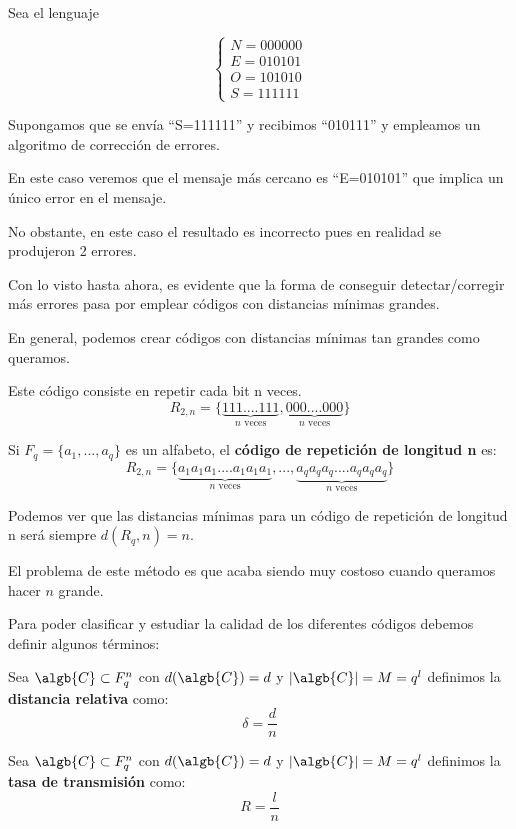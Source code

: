 \begin{example}
Sea el lenguaje

\[\left\{ \begin{array}{l}
N = 000000 \\ E = 010101 \\ O = 101010 \\ S = 111111
\end{array}\right.\]

Supongamos que se envía ``S=111111'' y recibimos ``010111'' y empleamos un algoritmo de corrección de errores.

En este caso veremos que el mensaje más cercano es ``E=010101'' que implica un único error en el mensaje.

No obstante, en este caso el resultado es incorrecto pues en realidad se produjeron 2 errores.
\end{example}

Con lo visto hasta ahora, es evidente que la forma de conseguir detectar/corregir más errores pasa por emplear códigos con distancias mínimas grandes.

En general, podemos crear códigos con distancias mínimas tan grandes como queramos.

\begin{defn}
Este código consiste en repetir cada bit n veces.
\[R_{2,n}=\{\underbrace{111....111}_{n\text{ veces}}, \underbrace{000....000}_{n\text{ veces}}\}\]

Si $F_q=\{a_1,...,a_q\}$ es un alfabeto, el \textbf{código de repetición de longitud n} es:
\[R_{2,n}=\{\underbrace{a_1a_1a_1....a_1a_1a_1}_{n\text{ veces}}, ... , \underbrace{a_qa_qa_q....a_qa_qa_q}_{n\text{ veces}}\}\]
\end{defn}

Podemos ver que las distancias mínimas para un código de repetición de longitud n será siempre $d(R_q,n)=n$.

El problema de este método es que acaba siendo muy costoso cuando queramos hacer $n$ grande.

Para poder clasificar y estudiar la calidad de los diferentes códigos debemos definir algunos términos:

\begin{defn}
Sea $\algb{C} \subset F_q^n$ con $d(\algb{C})=d$ y $|\algb{C}|=M=q^l$ definimos la \textbf{distancia relativa} como:
\[δ=\frac{d}{n}\]
\end{defn}

\begin{defn}
Sea $\algb{C} \subset F_q^n$ con $d(\algb{C})=d$ y $|\algb{C}|=M=q^l$ definimos la \textbf{tasa de transmisión} como:
\[R=\frac{l}{n}\]
\end{defn}

